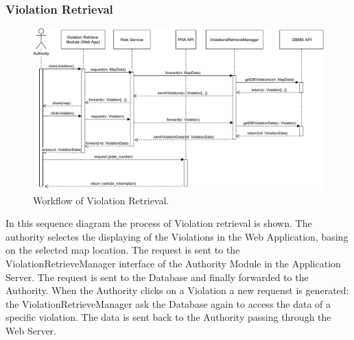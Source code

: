\documentclass[12pt,a4paper]{article}
\begin{document}
\subsubsection{Violation Retrieval}
\begin{figure}[H]
		\centering
		\includegraphics[width=1.0\linewidth]{../assets/sequence_diagrams/exports/workflw_violation_retrieval_complete.pdf}
		\caption{Workflow of Violation Retrieval.}
	\end{figure}
In this sequence diagram the process of Violation retrieval is shown. The authority selectes the displaying of the Violations in the Web Application, basing on the selected map location. The request is sent to the ViolationRetrieveManager interface of the Authority Module in the Application Server. The request is sent to the Database and finally forwarded to the Authority. When the Authority clicks on a Violation a new requenst is generated: the ViolationRetrieveManager ask the Database again to access the data of a specific violation. The data is sent back to the Authority passing through the Web Server.
\end{document}
